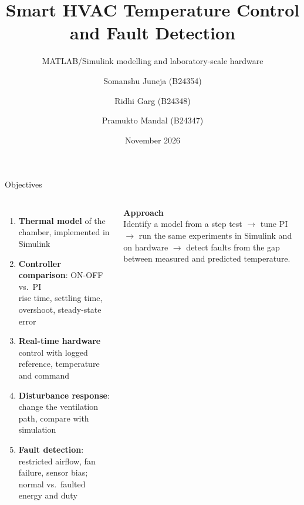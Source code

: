 \documentclass[aspectratio=169,10pt]{beamer}
\title{Smart HVAC Temperature Control and Fault Detection}
\subtitle{MATLAB/Simulink modelling and laboratory-scale hardware}
\author{Somanshu Juneja (B24354) \and Ridhi Garg (B24348) \and Pramukto Mandal (B24347)}
\institute{EE302 Control Systems Laboratory \,\textbullet\, Group 2 \,\textbullet\, Problem Statement 4\\ IIT Mandi}
\date{November 2026}
\begin{document}
\begin{frame}
\titlepage
\end{frame}

\begin{frame}{Objectives}
\begin{columns}[T]
\begin{enumerate}
\item \textbf{Thermal model} of the chamber, implemented in Simulink
\item \textbf{Controller comparison}: ON-OFF vs.\ PI\\ rise time, settling time, overshoot, steady-state error
\item \textbf{Real-time hardware} control with logged reference, temperature and command
\item \textbf{Disturbance response}: change the ventilation path, compare with simulation
\item \textbf{Fault detection}: restricted airflow, fan failure, sensor bias; normal vs.\ faulted energy and duty
\end{enumerate}
\small
\textbf{Approach}\\
Identify a model from a step test \(\to\) tune PI \(\to\) run the same experiments in Simulink and on hardware \(\to\) detect faults from the gap between measured and predicted temperature.
\end{columns}
\end{frame}
\end{document}
